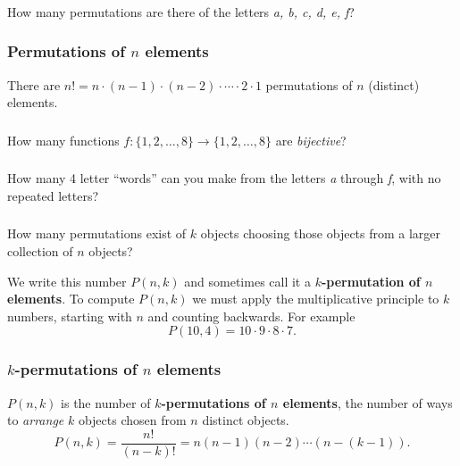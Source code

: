 \documentclass[11pt, compress]{beamer}
\newcommand{\terminology}[1]{\textbf{#1}}
\begin{document}
\begin{frame}
\frametitle{}
\begin{example}[1.3.1]How many permutations are there of the letters \emph{a, b, c, d, e, f}?
\end{example}
\end{frame}
 
\begin{frame}
\frametitle{Permutations of \(n\) elements}
 There are \(n! = n\cdot (n-1)\cdot (n-2)\cdot \cdots \cdot 2\cdot 1\) permutations of \(n\) (distinct) elements.
\end{frame}
 
\begin{frame}
\frametitle{}
\begin{example}How many functions \(f:\{1,2,\ldots,8\} \to \{1,2,\ldots, 8\}\) are \emph{bijective}?
\end{example}
\end{frame}
 
\begin{frame}
\frametitle{}
\begin{example}[1.3.3]How many 4 letter ``words'' can you make from the letters \emph{a} through \emph{f}, with no repeated letters?
\end{example}
\end{frame}
 
\begin{frame}
\frametitle{}
How many permutations exist of \(k\) objects choosing those objects from a larger collection of \(n\) objects?
 
\pause \vfill 

We write this number \(P(n,k)\) and sometimes call it a \terminology{\(k\)-permutation of \(n\) elements}. To compute \(P(n,k)\) we must apply the multiplicative principle to \(k\) numbers, starting with \(n\) and counting backwards. For example%
\begin{equation*}
P(10, 4) = 10\cdot 9 \cdot 8 \cdot 7\text{.}
\end{equation*}

\end{frame}
 
\begin{frame}
\frametitle{\(k\)-permutations of \(n\) elements}
  \(P(n,k)\) is the number of \terminology{\(k\)-permutations of \(n\) elements}, the number of ways to \emph{arrange} \(k\) objects chosen from \(n\) distinct objects.%
\begin{equation*}
P(n,k) = \frac{n!}{(n-k)!} = n(n-1)(n-2)\cdots (n-(k-1))\text{.}
\end{equation*}

\end{frame}
 
\end{document}
